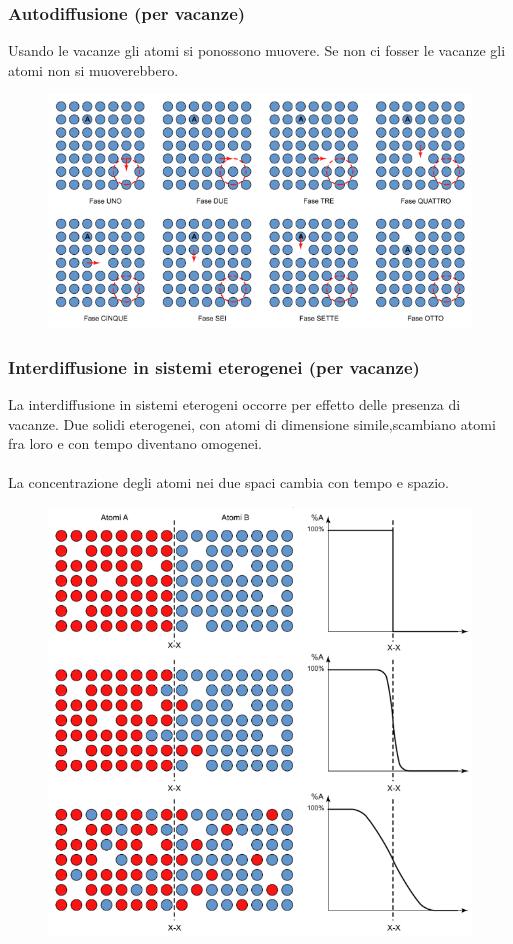 \documentclass{article}
\begin{document}
            \subsubsection{Autodiffusione (per vacanze)}
                Usando le vacanze gli atomi si ponossono muovere. Se non ci fosser le vacanze gli atomi non si muoverebbero.
                \begin{figure}[!h]
                    \centering
                    \includegraphics[width=.85\linewidth]{Autodiffusione per vacanze.png}
                \end{figure}
            \subsubsection{Interdiffusione in sistemi eterogenei (per vacanze)}
                La interdiffusione in sistemi eterogeni occorre per effetto delle presenza di vacanze. Due solidi eterogenei, con atomi di dimensione simile,scambiano atomi fra loro e con tempo diventano omogenei.\\ \\
                La concentrazione degli atomi nei due spaci cambia con tempo e spazio.
                \begin{figure}[!h]
                    \centering
                    \includegraphics[width=.75\linewidth]{Interdiffusione in sistemi eterogeni (per vacanze).png}
                \end{figure}
\end{document}
